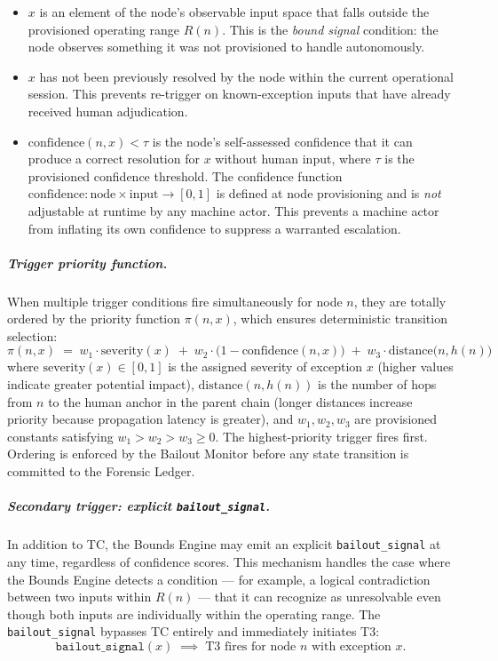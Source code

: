 \begin{itemize}\itemsep0em
\item[(i)] $x$ is an element of the node's observable input space that falls outside the provisioned operating range $R(n)$. This is the \emph{bound signal} condition: the node observes something it was not provisioned to handle autonomously.
\item[(ii)] $x$ has not been previously resolved by the node within the current operational session. This prevents re-trigger on known-exception inputs that have already received human adjudication.
\item[(iii)] $\text{confidence}(n, x) < \tau$ is the node's self-assessed confidence that it can produce a correct resolution for $x$ without human input, where $\tau$ is the provisioned confidence threshold. The confidence function $\text{confidence} : \text{node} \times \text{input} \rightarrow [0, 1]$ is defined at node provisioning and is \emph{not} adjustable at runtime by any machine actor. This prevents a machine actor from inflating its own confidence to suppress a warranted escalation.
\end{itemize}

\subparagraph{Trigger priority function.} When multiple trigger conditions fire simultaneously for node $n$, they are totally ordered by the priority function $\pi(n, x)$, which ensures deterministic transition selection:
\begin{equation}
\pi(n, x) \;=\; w_1 \cdot \text{severity}(x) \;+\; w_2 \cdot \bigl(1 - \text{confidence}(n, x)\bigr) \;+\; w_3 \cdot \text{distance}\bigl(n, h(n)\bigr) \tag{PF}
\end{equation}
where $\text{severity}(x) \in [0, 1]$ is the assigned severity of exception $x$ (higher values indicate greater potential impact), $\text{distance}(n, h(n))$ is the number of hops from $n$ to the human anchor in the parent chain (longer distances increase priority because propagation latency is greater), and $w_1, w_2, w_3$ are provisioned constants satisfying $w_1 > w_2 > w_3 \geq 0$. The highest-priority trigger fires first. Ordering is enforced by the Bailout Monitor before any state transition is committed to the Forensic Ledger.

\subparagraph{Secondary trigger: explicit \texttt{bailout\_signal}.} In addition to TC, the Bounds Engine may emit an explicit \texttt{bailout\_signal} at any time, regardless of confidence scores. This mechanism handles the case where the Bounds Engine detects a condition — for example, a logical contradiction between two inputs within $R(n)$ — that it can recognize as unresolvable even though both inputs are individually within the operating range. The \texttt{bailout\_signal} bypasses TC entirely and immediately initiates T3:
\begin{equation}
\texttt{bailout\_signal}(x) \;\implies\; \text{T3 fires for node } n \text{ with exception } x. \tag{TC-secondary}
\end{equation}

